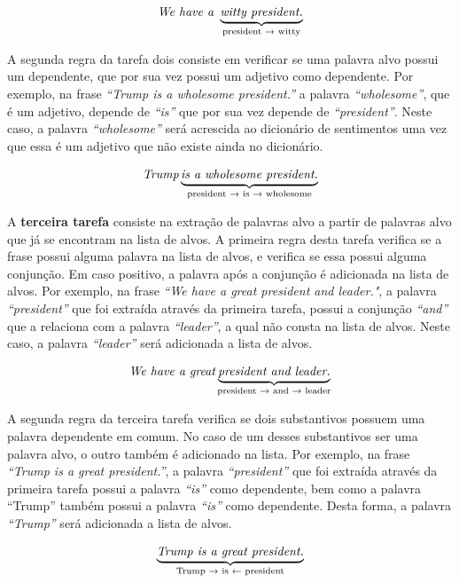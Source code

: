 \[\textit{We have a } \underbrace{\textit{witty president.}}_\text{president
\textrightarrow \text{ witty}}\]

A segunda regra da tarefa dois
consiste em verificar se uma palavra alvo possui um dependente, que por sua vez
possui um adjetivo como dependente. Por exemplo, na frase
\textit{``Trump is a wholesome president.''} a palavra \textit{``wholesome''}, que é um
adjetivo, depende de \textit{``is''} que por sua vez depende de
\textit{``president''}. Neste caso, a palavra \textit{``wholesome''}
será acrescida ao dicionário de sentimentos uma vez que essa é um adjetivo que
não existe ainda no dicionário.

\[\textit{Trump} \underbrace{\textit{is a wholesome president.}}_\text{president
\textrightarrow \text{ is} \textrightarrow \text{ wholesome}}\]

A \textbf{terceira tarefa} consiste na extração de palavras alvo a partir de
palavras alvo que já se encontram na lista de alvos. A primeira regra desta
tarefa verifica se a frase possui alguma palavra na lista de alvos, e verifica se essa possui alguma
conjunção. Em caso positivo, a palavra após a conjunção é adicionada na lista
de alvos. Por exemplo, na frase \textit{``We have a great president and
leader."}, a palavra \textit{``president''} que foi extraída através
da primeira tarefa, possui a conjunção \textit{``and''} que a relaciona com a
palavra \textit{``leader''}, a qual não consta na lista de alvos. Neste
caso, a palavra \textit{``leader''} será adicionada a lista de alvos.


\[\textit{We have a great} \underbrace{\textit{president and
leader.}}_\text{president \textrightarrow \text{ and} \textrightarrow \text{
leader}}\]

A segunda regra da terceira tarefa verifica se dois substantivos
possuem uma palavra dependente em comum. No caso de um desses substantivos ser
uma palavra alvo, o outro também é adicionado na lista. Por exemplo, na frase
\textit{``Trump is a great president.''}, a palavra \textit{``president''} que
foi extraída através da primeira tarefa possui a palavra \textit{``is''} como
dependente, bem como a palavra ``Trump'' também possui a palavra \textit{``is''}
como dependente. Desta forma, a palavra \textit{``Trump''} será adicionada a
lista de alvos.

\[\underbrace{\textit{Trump is a great president.}}_\text{Trump
\textrightarrow \text{ is} \textleftarrow \text{ president}}\]



